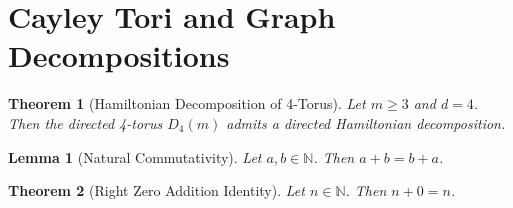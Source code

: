 \documentclass{article}
\newtheorem{theorem}{Theorem}
\newtheorem{lemma}{Lemma}
\begin{document}
\section{Cayley Tori and Graph Decompositions}

\begin{theorem}[Hamiltonian Decomposition of 4-Torus]
\label{thm:torus_hamiltonian}
Let $m \ge 3$ and $d = 4$. Then the directed 4-torus $D_4(m)$ admits a directed Hamiltonian decomposition.
\end{theorem}

\begin{lemma}[Natural Commutativity]
\label{lem:nat_add_comm}
Let $a, b \in \mathbb{N}$. Then $a + b = b + a$.
\end{lemma}

\begin{theorem}[Right Zero Addition Identity]
\label{thm:nat_add_zero}
Let $n \in \mathbb{N}$. Then $n + 0 = n$.
\end{theorem}
\end{document}
